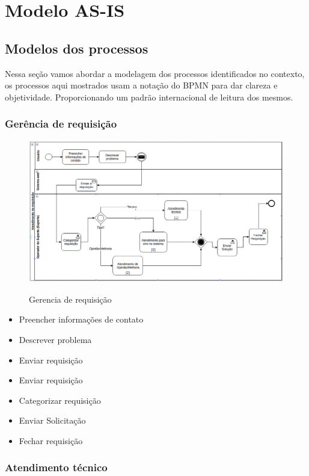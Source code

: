 \section{Modelo AS-IS}

\subsection{Modelos dos processos}
Nessa seção vamos abordar a modelagem dos processos identificados no contexto,
os processos aqui mostrados usam a notação do BPMN para dar clareza e objetividade.
Proporcionando um padrão internacional de leitura dos mesmos.

\subsubsection{Gerência de requisição}
\begin{figure}[!h]
\caption{Gerencia de requisição}
\centering %
\includegraphics[width=15cm]{as-is/01_atendimento_de_requisicao.png}
\label{figura:atendimento_requisicao_as_is}
\end{figure}

\begin{itemize}[noitemsep]
	\item Preencher informações de contato
	\item Descrever problema
	\item Enviar requisição
	\item Enviar requisição
	\item Categorizar requisição
	\item Enviar Solicitação
	\item Fechar requisição
\end{itemize}

\subsubsection{Atendimento técnico}

